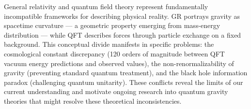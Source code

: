 General relativity and quantum field theory represent fundamentally incompatible frameworks for describing physical reality. GR portrays gravity as spacetime curvature — a geometric property emerging from mass-energy distribution — while QFT describes forces through particle exchange on a fixed background. This conceptual divide manifests in specific problems: the cosmological constant discrepancy (120 orders of magnitude between QFT vacuum energy predictions and observed values), the non-renormalizability of gravity (preventing standard quantum treatment), and the black hole information paradox (challenging quantum unitarity). These conflicts reveal the limits of our current understanding and motivate ongoing research into quantum gravity theories that might resolve these theoretical inconsistencies.
